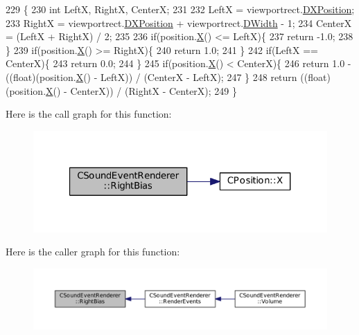 \begin{DoxyCode}
229                                                                                              \{
230     \textcolor{keywordtype}{int} LeftX, RightX, CenterX;
231     
232     LeftX = viewportrect.\hyperlink{structSRectangle_abcbddb03b3ee416cc33109833b5f075c}{DXPosition};
233     RightX = viewportrect.\hyperlink{structSRectangle_abcbddb03b3ee416cc33109833b5f075c}{DXPosition} + viewportrect.\hyperlink{structSRectangle_a4150898b3f7d90f6e4b0d44bf1ae3bd2}{DWidth} - 1;
234     CenterX = (LeftX + RightX) / 2;
235     
236     \textcolor{keywordflow}{if}(position.\hyperlink{classCPosition_a9a6b94d3b91df1492d166d9964c865fc}{X}() <= LeftX)\{
237         \textcolor{keywordflow}{return} -1.0;   
238     \}
239     \textcolor{keywordflow}{if}(position.\hyperlink{classCPosition_a9a6b94d3b91df1492d166d9964c865fc}{X}() >= RightX)\{
240         \textcolor{keywordflow}{return} 1.0;
241     \}
242     \textcolor{keywordflow}{if}(LeftX == CenterX)\{
243         \textcolor{keywordflow}{return} 0.0;   
244     \}
245     \textcolor{keywordflow}{if}(position.\hyperlink{classCPosition_a9a6b94d3b91df1492d166d9964c865fc}{X}() < CenterX)\{
246         \textcolor{keywordflow}{return} 1.0 - ((float)(position.\hyperlink{classCPosition_a9a6b94d3b91df1492d166d9964c865fc}{X}() - LeftX)) / (CenterX - LeftX);
247     \}
248     \textcolor{keywordflow}{return} ((\textcolor{keywordtype}{float})(position.\hyperlink{classCPosition_a9a6b94d3b91df1492d166d9964c865fc}{X}() - CenterX)) / (RightX - CenterX);
249 \}
\end{DoxyCode}
Here is the call graph for this function\+:\nopagebreak
\begin{figure}[H]
\begin{center}
\leavevmode
\includegraphics[width=321pt]{classCSoundEventRenderer_a4be5ff09785c55c3b5b6966fb41eb47f_cgraph}
\end{center}
\end{figure}
Here is the caller graph for this function\+:\nopagebreak
\begin{figure}[H]
\begin{center}
\leavevmode
\includegraphics[width=350pt]{classCSoundEventRenderer_a4be5ff09785c55c3b5b6966fb41eb47f_icgraph}
\end{center}
\end{figure}
\hypertarget{classCSoundEventRenderer_a96b3c1c479057daa5f62b73bab6409a3}{}\label{classCSoundEventRenderer_a96b3c1c479057daa5f62b73bab6409a3} 
